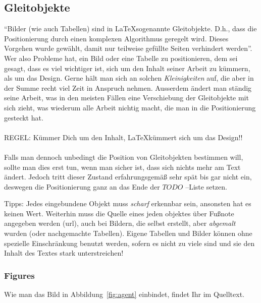 \subsection{Gleitobjekte}
\label{gleitobj}
``Bilder (wie auch Tabellen) sind in \LaTeX sogenannte Gleitobjekte. D.h., dass die Positionierung durch einen komplexen Algorithmus geregelt wird. Dieses Vorgehen wurde gewählt, damit nur teilweise gefüllte Seiten verhindert werden''\cite{fitz}.
Wer also Probleme hat, ein Bild oder eine Tabelle zu positionieren, dem sei gesagt, dass es viel wichtiger ist, sich um den Inhalt seiner Arbeit zu kümmern, als um das Design. Gerne hält man sich an solchen {\em Kleinigkeiten} auf, die aber in der Summe recht viel Zeit in Anspruch nehmen. Ausserdem ändert man ständig seine Arbeit, was in den meisten Fällen eine Verschiebung der Gleitobjekte mit sich zieht, was wiederum alle Arbeit nichtig macht, die man in die Positionierung gesteckt hat. \\\\
{\Large REGEL: Kümmer Dich um den Inhalt, \LaTeX kümmert sich um das Design!!}\\\\
Falls man dennoch unbedingt die Position von Gleitobjekten bestimmen will, sollte man dies erst tun, wenn man sicher ist, dass sich nichts mehr am Text ändert. Jedoch tritt dieser Zustand erfahrungsgemäß sehr spät bis gar nicht ein, deswegen die Positionierung ganz an das Ende der $TODO$ --Liste setzen.

Tipps: Jedes eingebundene Objekt muss {\em scharf} erkennbar sein, ansonsten hat es keinen Wert. Weiterhin muss die Quelle eines jeden objektes über Fußnote angegeben werden (url), auch bei Bildern, die selbst erstellt, aber {\em abgemalt} wurden (oder nachgemachte Tabellen). Eigene Tabellen und Bilder können ohne spezielle Einschränkung benutzt werden, sofern es nicht zu viele sind und sie den Inhalt des Textes stark unterstreichen!
\subsubsection{Figures}
Wie man das Bild in Abbildung~\ref{fig:agent} einbindet, findet Ihr im Quelltext.

